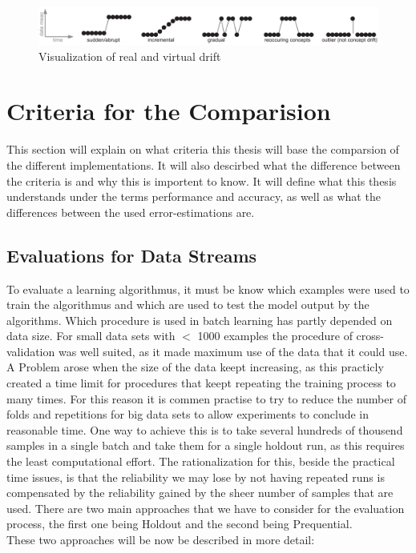 \documentclass[12pt,oneside,a4paper,parskip]{scrbook}
\begin{document}
\begin{figure}[H]
  \centering
  \includegraphics[width=\columnwidth]{Concept_2}
  \caption{Visualization of real and virtual drift \cite{ConceptDrift}} 
  \label{fig:concept_2}
\end{figure}

\cite{ConceptDrift}

\section{Criteria for the Comparision}

This section will explain on what criteria this thesis will base the comparsion of the different implementations. 
It will also descirbed what the difference between the criteria is and why this is importent to know.
It will define what this thesis understands under the terms performance and accuracy, as well as what the differences
between the used error-estimations are.

\subsection{Evaluations for Data Streams}
To evaluate a learning algorithmus, it must be know which examples were used to train the algorithmus and which are used to 
test the model output by the algorithms. Which procedure is used in batch learning has partly depended on data size.
For small data sets with $<$ 1000 examples the procedure of cross-validation was well suited, as it made maximum use of the
data that it could use.
A Problem arose when the size of the data keept increasing, as this practicly created a time limit for procedures that keept
repeating the training process to many times.
For this reason it is commen practise to try to reduce the number of folds and repetitions for big data sets to allow experiments
to conclude in reasonable time. 
One way to achieve this is to take several hundreds of thousend samples in a single batch and take them for a single holdout run,
as this requires the least computational effort. The rationalization for this, beside the practical time issues, is that the 
reliability we may lose by not having repeated runs is compensated by the reliability gained by the sheer number of samples that are used. 
There are two main approaches that we have to consider for the evaluation process, the first one being Holdout and the second being 
Prequential. \cite{Bifet_datastream} \\
These two approaches will be now be described in more detail:
\end{document}
